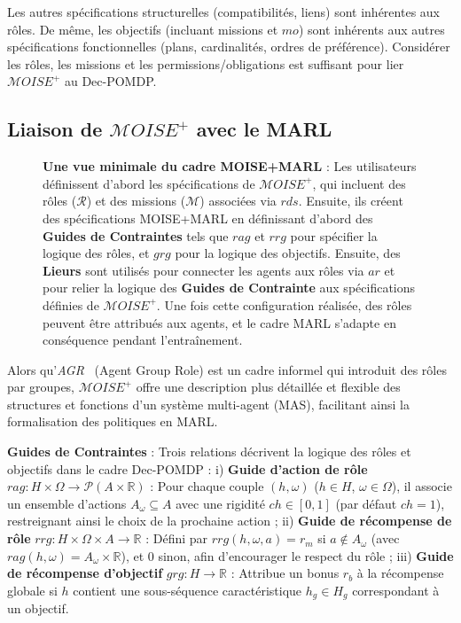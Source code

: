 \documentclass[francais,ROIA,Unicode,manuscript]{cedram}
\begin{document}
Les autres spécifications structurelles (compatibilités, liens) sont inhérentes aux rôles. De même, les objectifs (incluant missions et \(mo\)) sont inhérents aux autres spécifications fonctionnelles (plans, cardinalités, ordres de préférence). Considérer les rôles, les missions et les permissions/obligations est suffisant pour lier \(\mathcal{M}OISE^+\) au Dec-POMDP.


\subsection{Liaison de \(\mathcal{M}OISE^+\) avec le MARL}

\begin{figure}[h!]

    \caption{\textbf{Une vue minimale du cadre MOISE+MARL} :
        Les utilisateurs définissent d'abord les spécifications de \(\mathcal{M}OISE^+\), qui incluent des rôles (\(\mathcal{R}\)) et des missions (\(\mathcal{M}\)) associées via \(rds\). Ensuite, ils créent des spécifications MOISE+MARL en définissant d'abord des \textbf{Guides de Contraintes} tels que \(rag\) et \(rrg\) pour spécifier la logique des rôles, et \(grg\) pour la logique des objectifs.
        Ensuite, des \textbf{Lieurs} sont utilisés pour connecter les agents aux rôles via \(ar\) et pour relier la logique des \textbf{Guides de Contrainte} aux spécifications définies de \(\mathcal{M}OISE^+\). Une fois cette configuration réalisée, des rôles peuvent être attribués aux agents, et le cadre MARL s'adapte en conséquence pendant l'entraînement.
    }
    \label{fig:mm_synthesis}
\end{figure}

Alors qu'\textit{AGR}~\cite{ferber2003} (Agent Group Role) est un cadre informel qui introduit des rôles par groupes, \(\mathcal{M}OISE^+\) offre une description plus détaillée et flexible des structures et fonctions d'un système multi-agent (MAS), facilitant ainsi la formalisation des politiques en MARL.

\medskip
\noindent \textbf{Guides de Contraintes} : Trois relations décrivent la logique des rôles et objectifs dans le cadre Dec-POMDP :
i) \textbf{Guide d'action de rôle} \(rag: H \times \Omega \to \mathcal{P}(A \times \mathbb{R})\) : Pour chaque couple \((h,\omega)\) (\(h\in H\), \(\omega\in \Omega\)), il associe un ensemble d'actions \(A_\omega \subseteq A\) avec une rigidité \(ch \in [0,1]\) (par défaut \(ch=1\)), restreignant ainsi le choix de la prochaine action ; \quad
ii) \textbf{Guide de récompense de rôle} \(rrg: H \times \Omega \times A \to \mathbb{R}\) : Défini par \(rrg(h,\omega,a)=r_m\) si \(a \notin A_\omega\) (avec \(rag(h,\omega)=A_\omega \times \mathbb{R}\)), et 0 sinon, afin d'encourager le respect du rôle ; \quad
iii) \textbf{Guide de récompense d'objectif} \(grg: H \to \mathbb{R}\) : Attribue un bonus \(r_b\) à la récompense globale si \(h\) contient une sous-séquence caractéristique \(h_g \in H_g\) correspondant à un objectif.
\end{document}
